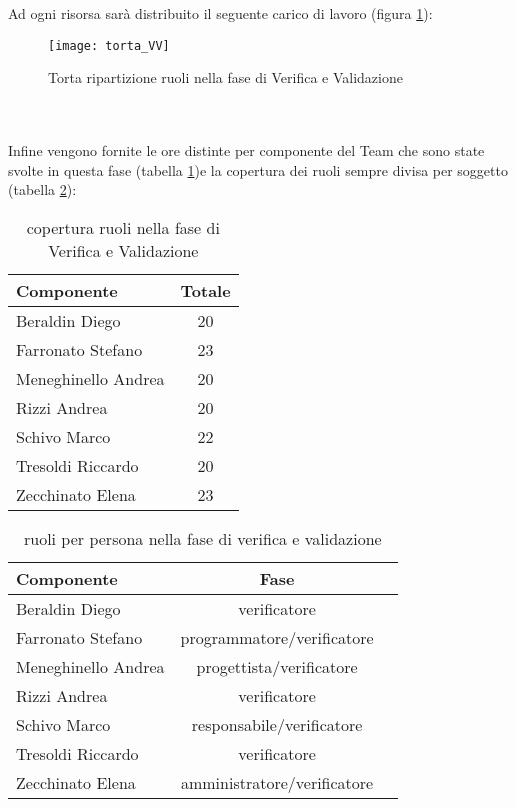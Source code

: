 \clearpage
Ad ogni risorsa sarà distribuito il seguente carico di lavoro (figura \ref{fig:ruolivv}):\\
\begin{figure}[h!]
\centering
  \texttt{[image: torta\_VV]}
\caption{Torta ripartizione ruoli nella fase di Verifica e Validazione}\label{fig:ruolivv}
\end{figure}
\\\\
Infine vengono fornite le ore distinte per componente del Team che sono state svolte in questa fase (tabella \ref{tab:ruolivv2})e la copertura dei ruoli sempre divisa per soggetto (tabella \ref{tab:ruolivv3}):\\
\begin{table}[h]
\centering
\begin{tabular}{|l|c|}
\hline
Componente& Totale \\
\hline
Beraldin Diego & 20\\
Farronato Stefano & 23\\
Meneghinello Andrea & 20\\
Rizzi Andrea & 20\\
Schivo Marco & 22\\
Tresoldi Riccardo & 20\\
Zecchinato Elena & 23\\
\hline
\end{tabular}
\caption{copertura ruoli nella fase di Verifica e Validazione}\label{tab:ruolivv2}
\end{table}

\begin{table}[h!]
\centering
\begin{tabular}{|l|c|c|}
\hline
Componente& Fase\\
\hline
Beraldin Diego &verificatore\\
Farronato Stefano & programmatore/verificatore\\
Meneghinello Andrea &progettista/verificatore\\
Rizzi Andrea &verificatore\\
Schivo Marco &responsabile/verificatore\\
Tresoldi Riccardo &verificatore\\
Zecchinato Elena &amministratore/verificatore\\
\hline
\end{tabular}
\caption{ruoli per persona nella fase di verifica e validazione}\label{tab:ruolivv3}
\end{table}

